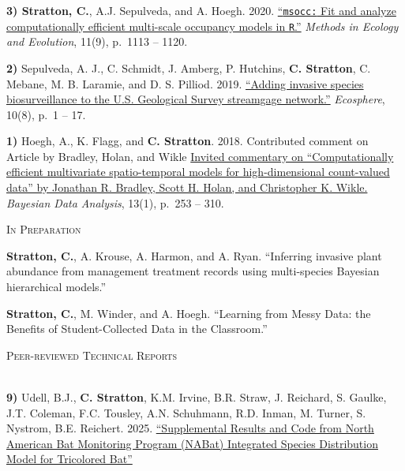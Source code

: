 \documentclass[a4paper]{article}
\newcommand{\lineunder} {
	\vspace*{-8pt} \\
	\hspace*{-18pt} \hrulefill \\
}
\newcommand{\header} [1] {
	{\hspace*{-18pt}\vspace*{6pt} \textcolor{Cerulean}{\textsc{#1}}}
	\vspace*{-6pt} \textcolor{Cerulean}{\lineunder}
}
\newcommand{\subheader} [1] {
	{\hspace*{-9pt}\vspace*{6pt} \textcolor{Cerulean}{\textsc{#1}}}
	\vspace*{-6pt}
}
\begin{document}
\textbf{3) Stratton, C.}, A.J. Sepulveda, and A. Hoegh. 2020.
\href{https://doi.org/10.1111/2041-210X.13442}{``\texttt{msocc:} Fit and
analyze computationally efficient multi-scale occupancy models in
\texttt{R}.''} \textit{Methods in Ecology and Evolution}, 11(9), p.~1113
-- 1120. \vspace*{2mm}

\textbf{2)} Sepulveda, A. J., C. Schmidt, J. Amberg, P. Hutchins,
\textbf{C. Stratton}, C. Mebane, M. B. Laramie, and D. S. Pilliod. 2019.
\href{https://doi.org/10.1002/ecs2.2843}{``Adding invasive species
biosurveillance to the U.S. Geological Survey streamgage network.''}
\textit{Ecosphere}, 10(8), p.~1 -- 17. \vspace*{2mm}

\textbf{1)} Hoegh, A., K. Flagg, and \textbf{C. Stratton}. 2018.
Contributed comment on Article by Bradley, Holan, and Wikle
\href{https://eds.p.ebscohost.com/abstract?site=eds&scope=site&jrnl=19360975&AN=138950462&h=fupOc1pyeH8dv67mdPoRzhYvo96LS\%2bzCYNHIjAcMPojnVBydkua\%2fXFU6RanU78MDh8WNMlzPVI\%2fBxvaUiWvg\%2bw\%3d\%3d&crl=c&resultLocal=ErrCrlNoResults&resultNs=Ehost&crlhashurl=login.aspx\%3fdirect\%3dtrue\%26profile\%3dehost\%26scope\%3dsite\%26authtype\%3dcrawler\%26jrnl\%3d19360975\%26AN\%3d138950462}{Invited
commentary on ``Computationally efficient multivariate spatio-temporal
models for high-dimensional count-valued data'' by Jonathan R. Bradley,
Scott H. Holan, and Christopher K. Wikle.}
\textit{Bayesian Data Analysis}, 13(1), p.~253 -- 310. \vspace*{2mm}

\subheader{In Preparation}
\vspace*{2mm}

\textbf{Stratton, C.}, A. Krouse, A. Harmon, and A. Ryan. ``Inferring
invasive plant abundance from management treatment records using
multi-species Bayesian hierarchical models.'' \vspace*{2mm}

\textbf{Stratton, C.}, M. Winder, and A. Hoegh. ``Learning from Messy
Data: the Benefits of Student-Collected Data in the Classroom.''
\vspace*{2mm}

\header{Peer-reviewed Technical Reports}
\vspace*{2mm}

\textbf{9)} Udell, B.J., \textbf{C. Stratton}, K.M. Irvine, B.R. Straw,
J. Reichard, S. Gaulke, J.T. Coleman, F.C. Tousley, A.N. Schuhmann, R.D.
Inman, M. Turner, S. Nystrom, B.E. Reichert. 2025.
\href{https://ui.adsabs.harvard.edu/abs/2025usgs.data..744U/abstract}{``Supplemental
Results and Code from North American Bat Monitoring Program (NABat)
Integrated Species Distribution Model for Tricolored Bat''}
\vspace*{2mm}
\end{document}
